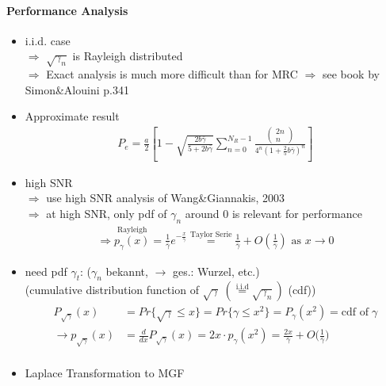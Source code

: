 \documentclass[a4paper, 10pt]{article}
\begin{document}
\paragraph*{Performance Analysis}
\begin{itemize}
	\item i.i.d. case \\
	$\Rightarrow$ $\sqrt{\gamma_n}$ is Rayleigh distributed\\
	$\Rightarrow$ Exact analysis is much more difficult than for MRC $\Rightarrow$ see book by Simon\&Alouini p.341
	\item Approximate result
\begin{align*}
	P_e=\frac{a}{2}\left[1-\sqrt{\frac{2b\bar{\gamma}}{5+2b\bar{\gamma}}}\sum\limits_{n=0}^{N_R-1}\frac{\left(\! \begin{array}{c} 2n \\ n \end{array} \!\right) }{4^n(1+\frac{2}{5}b\bar{\gamma})^n}\right]
\end{align*}
	\item high SNR\\
	$\Rightarrow$ use high SNR analysis of Wang\;\&\;Giannakis, 2003\\
	$\Rightarrow$ at high SNR, only pdf of $\gamma_n$ around $0$ is relevant for performance
\begin{align*}
	\Rightarrow \overset{\text{Rayleigh}}{p_\gamma(x)} = \frac{1}{\bar{\gamma}}e^{-\frac{x}{\bar{\gamma}}}\overset{\text{Taylor Serie}}{=}\frac{1}{\bar{\gamma}}+O\left(\frac{1}{\bar{\gamma}}\right)\text{ as } x \to 0
\end{align*}
	\item need pdf $\gamma _t$: ($\gamma _n$ bekannt, $\rightarrow$ ges.: Wurzel, etc.)\\ (cumulative distribution function of $\sqrt{\gamma}\;(\overset{\text{i.i.d}}{=}\sqrt{\gamma_n}) $ (cdf))
	\begin{align*}
		P_{\sqrt{\gamma}}(x) &= Pr\bigl\{\sqrt{\gamma}\leq x \bigr\} =  Pr\bigl\{\gamma\leq x^2 \bigr\} = P_{\gamma}(x^2) = \text{cdf of}\;\gamma\\
		\rightarrow p_{\sqrt{\gamma}}(x) &= \frac{d}{dx}P_{\sqrt{\gamma}}(x) = 2x\cdot p_{\gamma}(x^2) = \frac{2x}{\bar{\gamma}} + O\bigl(\frac{1}{\bar{\gamma}}\bigr)\\
	\end{align*}
	\item Laplace Transformation to MGF
	\begin{align*}

\end{align*}
\end{itemize}
\end{document}
